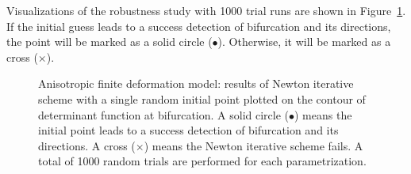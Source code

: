 \documentclass[12pt]{article}
\numberwithin{equation}{section}
\begin{document}
Visualizations of the robustness study with 1000 trial runs are shown
in Figure~\ref{fig:aniso_uniaxial_robust}. If the initial guess leads
to a success detection of bifurcation and its directions, the point
will be marked as a solid circle ($\bullet$). Otherwise, it will be
marked as a cross ($\times$).

\begin{figure}[H]
   \centering {}   
   \caption{Anisotropic finite deformation model: results of Newton
   iterative scheme with a single random initial point plotted on the
   contour of determinant function at bifurcation. A solid circle
   ($\bullet$) means the initial point leads to a success detection of
   bifurcation and its directions. A cross ($\times$) means the Newton
   iterative scheme fails. A total of 1000 random trials are performed
   for each parametrization.}
   \label{fig:aniso_uniaxial_robust}
 \end{figure}
\end{document}
